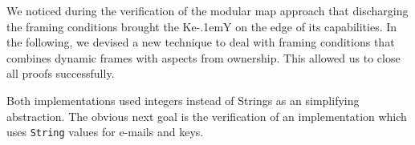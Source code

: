 \documentclass{llncs}
\newcommand{\KeY}{Ke\kern-.1emY\xspace}
\begin{document}

We noticed during the verification of the modular map approach that
discharging the framing conditions brought the \KeY on the edge of its
capabilities. In the following, we devised a new technique to deal
with framing conditions that combines dynamic frames with aspects from
ownership. This allowed us to close all proofs successfully.


Both implementations used integers instead of Strings as an
simplifying abstraction.
%
The obvious next goal is the verification of an implementation which
uses \texttt{String} values for e-mails and keys.
%
%



\end{document}
